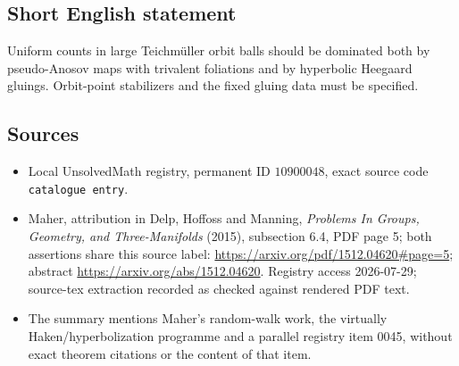 \documentclass[11pt]{article}
\begin{document}
\subsection{Short English statement}
Uniform counts in large Teichm\"uller orbit balls should be dominated both by pseudo-Anosov maps with trivalent foliations and by hyperbolic Heegaard gluings. Orbit-point stabilizers and the fixed gluing data must be specified.
\subsection{Sources}
\begin{itemize}
\item Local UnsolvedMath registry, permanent ID \(10900048\), exact source code \texttt{catalogue entry}.
\item Maher, attribution in Delp, Hoffoss and Manning, \emph{Problems In Groups, Geometry, and Three-Manifolds} (2015), subsection 6.4, PDF page 5; both assertions share this source label: \url{https://arxiv.org/pdf/1512.04620#page=5}; abstract \url{https://arxiv.org/abs/1512.04620}. Registry access 2026-07-29; source-tex extraction recorded as checked against rendered PDF text.
\item The summary mentions Maher's random-walk work, the virtually Haken/hyperbolization programme and a parallel registry item 0045, without exact theorem citations or the content of that item.
\end{itemize}
\end{document}

